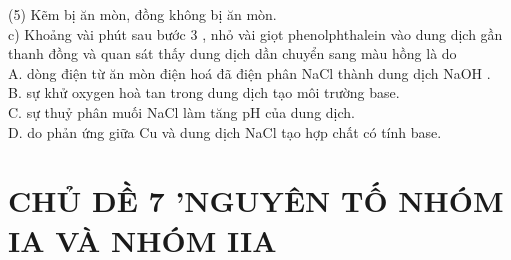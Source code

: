 \documentclass[10pt]{article}
\begin{document}
(5) Kẽm bị ăn mòn, đồng không bị ăn mòn.\\
c) Khoảng vài phút sau bước 3 , nhỏ vài giọt phenolphthalein vào dung dịch gần thanh đồng và quan sát thấy dung dịch dần chuyển sang màu hồng là do\\
A. dòng điện từ ăn mòn điện hoá đã điện phân NaCl thành dung dịch NaOH .\\
B. sự khử oxygen hoà tan trong dung dịch tạo môi trường base.\\
C. sự thuỷ phân muối NaCl làm tăng pH của dung dịch.\\
D. do phản ứng giữa Cu và dung dịch NaCl tạo hợp chất có tính base.

\section*{CHỦ DỀ 7 'NGUYÊN TỐ NHÓM IA VÀ NHÓM IIA}
\end{document}
